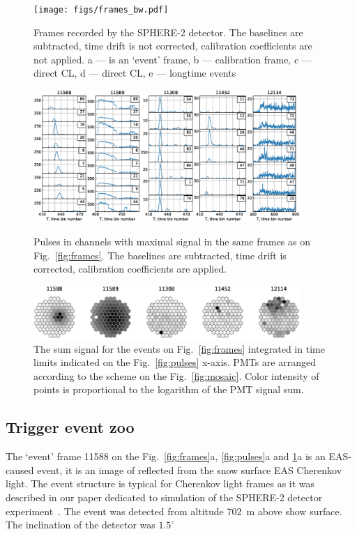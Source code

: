 \documentclass[final,5p,times,twocolumn]{elsarticle}
\begin{document}
\begin{figure}[btp]
    \centering
    \texttt{[image: figs/frames\_bw.pdf]}
    \caption{Frames recorded by the SPHERE-2 detector. The baselines are subtracted, time drift is not corrected, calibration coefficients are not applied. a --- is an `event' frame, b --- calibration frame, c --- direct CL, d --- direct CL, e --- longtime events}
\label{fig:frames}

    \includegraphics[width=0.9\textwidth]{figs/pulses.eps}%
    \caption{Pulses in channels with maximal signal in the same frames as on Fig.~\ref{fig:frames}. The baselines are subtracted, time drift is corrected, calibration coefficients are applied.}
\label{fig:pulses}
\vspace{1.2pc}
    \includegraphics[width=0.9\textwidth]{figs/mosaic_sums_lin.eps}%
    \vspace{-1.0pc}
    \caption{The sum signal for the events on Fig.~\ref{fig:frames} integrated in time limits indicated on the Fig.~\ref{fig:pulses} x-axis. PMTs are arranged according to the scheme on the Fig.~\ref{fig:mosaic}. Color intensity of points is proportional to the logarithm of the PMT signal sum.}
\label{fig:mosaic_sum}
\end{figure}


\subsection{Trigger event zoo}

The `event' frame 11588 on the Fig.~\ref{fig:frames}a, \ref{fig:pulses}a and \ref{fig:mosaic_sum}a is an EAS-caused event, it is an image of reflected from the snow surface EAS Cherenkov light. The event structure is typical for Cherenkov light frames as it was described in our paper dedicated to simulation of the SPHERE-2 detector experiment~\cite{Ant19}. The event was detected from altitude 702~m above show surface. The inclination of the detector was $1.5^{\circ}$
\end{document}
